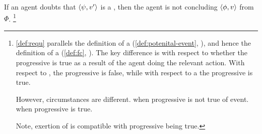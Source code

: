 \begin{note}
  If an agent doubts that \(\langle \psi, v' \rangle\) is a \fc{}, then the agent is not concluding \(\langle \phi, v \rangle\) from \(\Phi\).%
  \footnote{
    \autoref{def:requ} parallels the definition of a \pevent{} (\autoref{def:potenital-event}, ), and hence the definition of a \fc{} (\autoref{def:fc}, ).
    The key difference is with respect to whether the progressive is true as a result of the agent doing the relevant action.
    With respect to \ninf{}, the progressive is false, while with respect to a  the progressive is true.

    However, circumstances are different.
    \pevent{} when progressive is not true of event.
    \ninf{} when progressive is true.

    Note, exertion of \ninf{} is compatible with progressive being true.
  }
\end{note}

